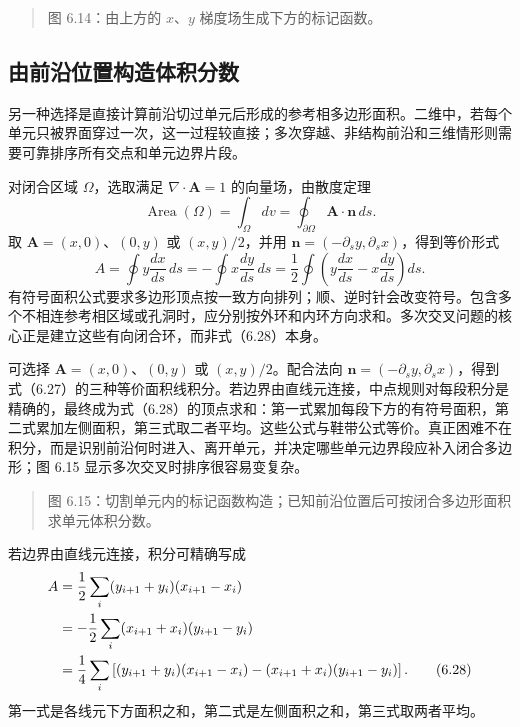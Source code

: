 \documentclass[11pt,a4paper,openany,fontset=none]{ctexbook}
\begin{document}
\begin{quote}\small 图 6.14：由上方的 $x$、$y$ 梯度场生成下方的标记函数。\end{quote}
\subsection{由前沿位置构造体积分数}

另一种选择是直接计算前沿切过单元后形成的参考相多边形面积。二维中，若每个单元只被界面穿过一次，这一过程较直接；多次穿越、非结构前沿和三维情形则需要可靠排序所有交点和单元边界片段。

对闭合区域 $\Omega$，选取满足 $\nabla\cdot\bm A=1$ 的向量场，由散度定理
\begin{equation}
\operatorname{Area}(\Omega)=\int_\Omega dv
=\oint_{\partial\Omega}\bm A\cdot\bm n\,ds.
\tag{6.26}
\end{equation}
取 $\bm A=(x,0)$、$(0,y)$ 或 $(x,y)/2$，并用
$\bm n=(-\partial_s y,\partial_s x)$，得到等价形式
\begin{equation}
A=\oint y\frac{dx}{ds}\,ds
=-\oint x\frac{dy}{ds}\,ds
=\frac12\oint\left(y\frac{dx}{ds}-x\frac{dy}{ds}\right)ds.
\tag{6.27}
\end{equation}
有符号面积公式要求多边形顶点按一致方向排列；顺、逆时针会改变符号。包含多个不相连参考相区域或孔洞时，应分别按外环和内环方向求和。多次交叉问题的核心正是建立这些有向闭合环，而非式（6.28）本身。

可选择 $\bm A=(x,0)$、$(0,y)$ 或 $(x,y)/2$。配合法向 $\bm n=(-\partial_sy,\partial_sx)$，得到式（6.27）的三种等价面积线积分。若边界由直线元连接，中点规则对每段积分是精确的，最终成为式（6.28）的顶点求和：第一式累加每段下方的有符号面积，第二式累加左侧面积，第三式取二者平均。这些公式与鞋带公式等价。真正困难不在积分，而是识别前沿何时进入、离开单元，并决定哪些单元边界段应补入闭合多边形；图 6.15 显示多次交叉时排序很容易变复杂。

\begin{quote}\small 图 6.15：切割单元内的标记函数构造；已知前沿位置后可按闭合多边形面积求单元体积分数。\end{quote}
若边界由直线元连接，积分可精确写成
\begin{align}
A&=\frac12\sum_i(y_{i+1}+y_i)(x_{i+1}-x_i)\notag\\
&=-\frac12\sum_i(x_{i+1}+x_i)(y_{i+1}-y_i)\notag\\
&=\frac14\sum_i\left[(y_{i+1}+y_i)(x_{i+1}-x_i)
-(x_{i+1}+x_i)(y_{i+1}-y_i)\right].
\tag{6.28}
\end{align}
第一式是各线元下方面积之和，第二式是左侧面积之和，第三式取两者平均。
\end{document}
